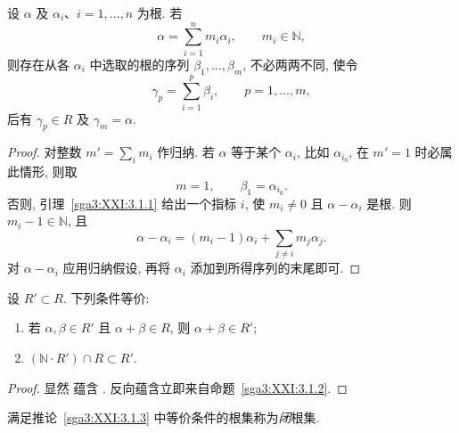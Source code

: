 \begin{proposition}\label{sga3:XXI:3.1.2}
设 \(\alpha\) 及 \(\alpha_i\)、\(i=1,\ldots,n\) 为根. 若
\[
 \alpha=\sum_{i=1}^n m_i\alpha_i,
 \qquad m_i\in\mathbb N,
\]
则存在从各 \(\alpha_i\) 中选取的根的序列 \(\beta_1,\ldots,\beta_m\), 不必两两不同, 使令
\[
 \gamma_p=\sum_{i=1}^p\beta_i,\qquad p=1,\ldots,m,
\]
后有 \(\gamma_p\in R\) 及 \(\gamma_m=\alpha\).
\end{proposition}
\begin{proof}
对整数 \(m'=\sum_i m_i\) 作归纳. 若 \(\alpha\) 等于某个 \(\alpha_i\), 比如 \(\alpha_{i_0}\), 在 \(m'=1\) 时必属此情形, 则取
\[
 m=1,\qquad\beta_1=\alpha_{i_0}.
\]
否则, 引理~\ref{sga3:XXI:3.1.1} 给出一个指标 \(i\), 使 \(m_i\neq0\) 且 \(\alpha-\alpha_i\) 是根. 则 \(m_i-1\in\mathbb N\), 且
\[
 \alpha-\alpha_i
 =(m_i-1)\alpha_i+\sum_{j\neq i}m_j\alpha_j.
\]
对 \(\alpha-\alpha_i\) 应用归纳假设, 再将 \(\alpha_i\) 添加到所得序列的末尾即可.
\end{proof}

\begin{corollary}\label{sga3:XXI:3.1.3}
设 \(R'\subset R\). 下列条件等价:
\begin{enumerate}
\item[\SGAInlineRefTarget{sga3:XXI:3.1.3:item:i}(i)] 若 \(\alpha,\beta\in R'\) 且 \(\alpha+\beta\in R\), 则 \(\alpha+\beta\in R'\);
\item[\SGAInlineRefTarget{sga3:XXI:3.1.3:item:ii}(ii)] \((\mathbb N\cdot R')\cap R\subset R'\).
\end{enumerate}
\end{corollary}
\begin{proof}
显然  蕴含 . 反向蕴含立即来自命题~\ref{sga3:XXI:3.1.2}.
\end{proof}

\begin{definition}\label{sga3:XXI:3.1.4}
满足推论~\ref{sga3:XXI:3.1.3} 中等价条件的根集称为\emph{闭}根集.
\end{definition}

